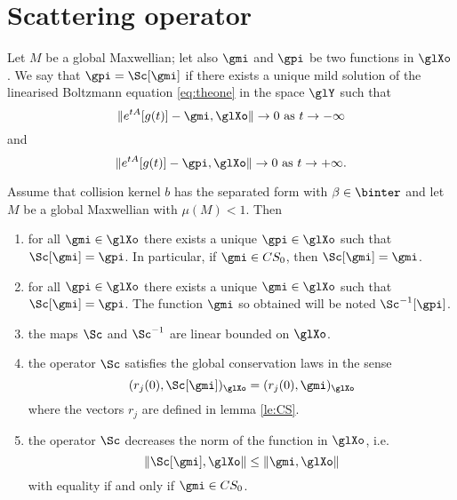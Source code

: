 \section{Scattering operator} %
\label{sec:scattering_operator}
\begin{definition}\label{def:sc}
	Let $M$ be a global Maxwellian; let also $\gmi$ and $\gpi$ be two functions in $\glXo$. We say that $\gpi=\Sc[\gmi]$ if there exists a unique mild solution of the linearised Boltzmann equation \eqref{eq:theone} in the space $\glY$ such that
	\[\|e^{tA}[g(t)]-\gmi,\glXo\|\to 0\mbox{ as }t\to -\infty\]
	and
	\[\|e^{tA}[g(t)]-\gpi,\glXo\|\to 0\mbox{ as }t\to +\infty.\]
\end{definition}
 
\begin{theorem}
	\label{th:sc}
	Assume that collision kernel $b$ has the separated form with $\beta\in \binter$ and let $M$ be a global Maxwellian with $\mu(M)<1$. Then
	\begin{enumerate}
		\item for all $\gmi\in\glXo$ there exists a unique $\gpi\in\glXo$ such that $\Sc[\gmi]=\gpi$. In particular, if $\gmi\in CS_0$, then $\Sc[\gmi]=\gmi$.
		\item  for all $\gpi\in\glXo$ there exists a unique $\gmi\in\glXo$ such that $\Sc[\gmi]=\gpi$. The function $\gmi$ so obtained will be noted $\Sc^{-1}[\gpi]$.
		\item the maps $\Sc$ and $\Sc^{-1}$ are linear bounded on $\glXo$.
		\item the operator $\Sc$ satisfies the global conservation laws in the sense
		\[
		(r_j(0),\Sc[\gmi])_{\glXo}
		=(r_j(0), \gmi )_{\glXo}
		\]
		where the vectors $r_j$ are defined in lemma \ref{le:CS}.
		\item the operator $\Sc$ decreases the norm of the function in $\glXo$, i.e.
		\[\|\Sc[\gmi],\glXo\|\le \|\gmi,\glXo\|\]
		with equality if and only if $\gmi\in CS_0$.
 	\end{enumerate}
\end{theorem}

